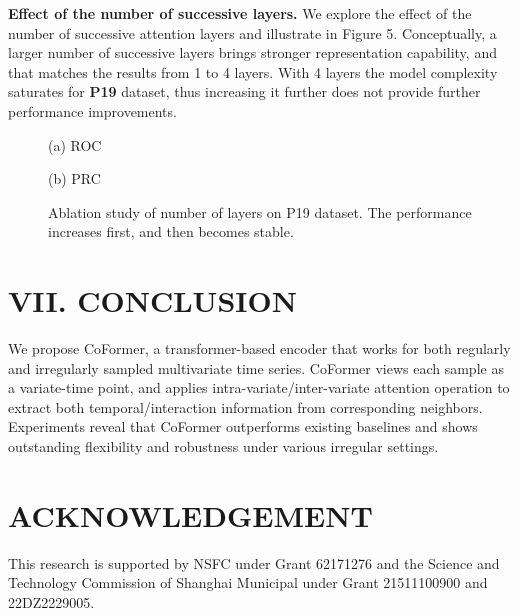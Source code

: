 \documentclass[twocolumn]{article}
\begin{document}
\noindent \textbf{Effect of the number of successive layers.} We explore the effect of the number of successive attention layers and illustrate in Figure 5. Conceptually, a larger number of successive layers brings stronger representation capability, and that matches the results from 1 to 4 layers. With 4 layers the model complexity saturates for \textbf{P19} dataset, thus increasing it further does not provide further performance improvements.

\begin{figure}[t]
    \centering
    \begin{minipage}{0.45\textwidth}
        \centering
        (a) ROC
    \end{minipage}
    \hfill
    \begin{minipage}{0.45\textwidth}
        \centering
        (b) PRC
    \end{minipage}
    \caption{Ablation study of number of layers on P19 dataset. The performance increases first, and then becomes stable.}
    \label{fig:ablation_study}
\end{figure}

\section*{VII. CONCLUSION}
We propose CoFormer, a transformer-based encoder that works for both regularly and irregularly sampled multivariate time series. CoFormer views each sample as a variate-time point, and applies intra-variate/inter-variate attention operation to extract both temporal/interaction information from corresponding neighbors. Experiments reveal that CoFormer outperforms existing baselines and shows outstanding flexibility and robustness under various irregular settings.

\section*{ACKNOWLEDGEMENT}
This research is supported by NSFC under Grant 62171276 and the Science and Technology Commission of Shanghai Municipal under Grant 21511100900 and 22DZ2229005.
\end{document}
